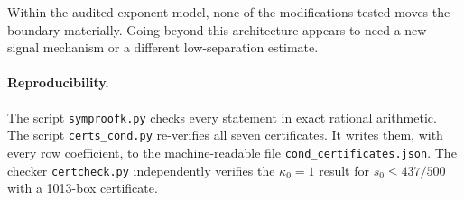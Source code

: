 \documentclass[11pt]{article}
\theoremstyle{remark}\newtheorem*{remark}{Remark}
\begin{document}
Within the audited exponent model, none of the modifications tested moves the boundary
materially. Going beyond this architecture appears to need a new signal mechanism or a
different low-separation estimate.

\paragraph{Reproducibility.} The script \texttt{symproofk.py} checks every statement in exact
rational arithmetic. The script \texttt{certs\_cond.py} re-verifies all seven certificates. It writes
them, with every row coefficient, to the machine-readable file \texttt{cond\_certificates.json}.
The checker \texttt{certcheck.py}
independently verifies the $\kappa_0=1$ result for $s_0\le437/500$ with a 1013-box certificate.

\appendix
\end{document}
